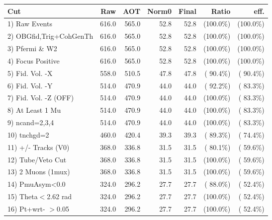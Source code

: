  \begin{table}[h!]\centering
 \begin{tabular}{||l||r|r|r|r|r|r||}
 \hline
 \hline
 Cut & Raw & AOT & Norm0 & Final & Ratio & eff.       \\
 \hline
  1) Raw Events           &        616.0 &        565.0 &         52.8 &         52.8 & (100.0\%) & (100.0\%) \\
  2) OBGfid,Trig+CohGenTh &        616.0 &        565.0 &         52.8 &         52.8 & (100.0\%) & (100.0\%) \\
  3) Pfermi \& W2         &        616.0 &        565.0 &         52.8 &         52.8 & (100.0\%) & (100.0\%) \\
  4) Focus Positive       &        616.0 &        565.0 &         52.8 &         52.8 & (100.0\%) & (100.0\%) \\
  5) Fid. Vol. -X         &        558.0 &        510.5 &         47.8 &         47.8 & ( 90.4\%) & ( 90.4\%) \\
  6) Fid. Vol. -Y         &        514.0 &        470.9 &         44.0 &         44.0 & ( 92.2\%) & ( 83.3\%) \\
  7) Fid. Vol. -Z (OFF)   &        514.0 &        470.9 &         44.0 &         44.0 & (100.0\%) & ( 83.3\%) \\
  8) At Least 1 Mu        &        514.0 &        470.9 &         44.0 &         44.0 & (100.0\%) & ( 83.3\%) \\
  9) ncand=2,3,4          &        514.0 &        470.9 &         44.0 &         44.0 & (100.0\%) & ( 83.3\%) \\
 10) tnchgd=2             &        460.0 &        420.4 &         39.3 &         39.3 & ( 89.3\%) & ( 74.4\%) \\
 11) +/- Tracks (V0)      &        368.0 &        336.8 &         31.5 &         31.5 & ( 80.1\%) & ( 59.6\%) \\
 12) Tube/Veto Cut        &        368.0 &        336.8 &         31.5 &         31.5 & (100.0\%) & ( 59.6\%) \\
 13) 2 Muons (1mux)       &        368.0 &        336.8 &         31.5 &         31.5 & (100.0\%) & ( 59.6\%) \\
 14) PmuAsym<0.0          &        324.0 &        296.2 &         27.7 &         27.7 & ( 88.0\%) & ( 52.4\%) \\
 15) Theta$<$2.62 rad     &        324.0 &        296.2 &         27.7 &         27.7 & (100.0\%) & ( 52.4\%) \\
 16) Pt+wrt- $>$0.05      &        324.0 &        296.2 &         27.7 &         27.7 & (100.0\%) & ( 52.4\%) \\

\end{tabular}
\end{table}

